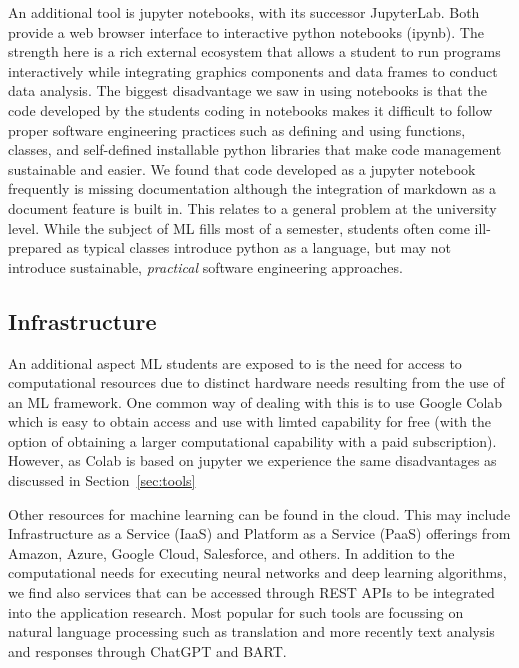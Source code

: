 \documentclass[utf8]{FrontiersinVancouver} %
\begin{document}
An additional tool is jupyter notebooks, with its successor JupyterLab. Both
provide a web browser interface to interactive python notebooks
(ipynb). The strength here is a rich external ecosystem that allows a student
to run programs interactively while integrating graphics
components and data frames to conduct data analysis.  The biggest
disadvantage we saw in using notebooks is that the code developed by
the students coding in notebooks makes it difficult to follow proper software engineering practices
such as defining and using functions, classes, and self-defined
installable python libraries that make code management sustainable and
easier. We found that code developed as a jupyter notebook frequently
is missing documentation although the integration of markdown as a document
feature is built in. This relates to a general problem at the
university level. While the subject of ML fills most of a
semester, students often come ill-prepared as typical
classes introduce python as a language, but may not introduce sustainable,
{\em practical} software engineering approaches.

\subsection{Infrastructure}

An additional aspect ML students are exposed to is the need for access
to computational resources due to distinct hardware needs resulting from
the use of an ML framework. One common way of dealing with
this is to use Google Colab which is easy to obtain access and use
with limted capability for free (with the option of obtaining a larger
computational capability with a paid subscription).  However, as Colab is
based on jupyter we experience the same disadvantages as discussed in
Section~\ref{sec:tools}

Other resources for machine learning can be found in the cloud. This
may include Infrastructure as a Service (IaaS) and Platform as a Service (PaaS)
offerings from Amazon, Azure, Google Cloud,
Salesforce, and others.  In addition to the computational needs for
executing neural networks and deep learning algorithms, we find also
services that can be accessed through REST APIs to be
integrated into the application research. Most popular for such tools
are focussing on natural language processing such as translation and
more recently text analysis and responses through ChatGPT and BART.
\end{document}
